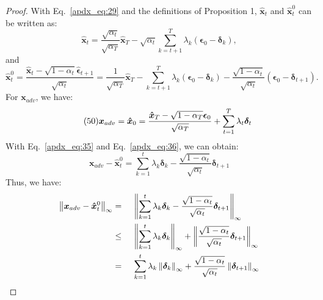 \documentclass{article}
\newtheorem{proof}{Proof}
\begin{document}
\begin{proof}
With Eq.~\eqref{apdx_eq:29} and the definitions of Proposition 1, $\boldsymbol{\hat{x}}_{t}$ and $\boldsymbol{\hat{x}}_{t}^0$ can be written as:
\begin{equation}
    \tag{48}
    \label{apdx_eq:34}
    \boldsymbol{\hat{x}}_{t} = \frac{\sqrt{\alpha_t}}{\sqrt{\alpha_T}}\boldsymbol{\hat{x}}_{T} - \sqrt{\alpha_t}\sum_{k=t+1}^{T}\lambda_k\left(\boldsymbol{\epsilon}_0 - \boldsymbol{\delta}_k\right),
\end{equation}
and 
\begin{equation}
    \tag{49}
    \label{apdx_eq:35}
    \boldsymbol{\hat{x}}_{t}^0 = \frac{\boldsymbol{\hat{x}}_t-\sqrt{1-\alpha_t}\boldsymbol{\hat{\epsilon}}_{t+1}}{\sqrt{\alpha_t}} =
    \frac{1}{\sqrt{\alpha_T}}\boldsymbol{\hat{x}}_{T} - \sum_{k=t+1}^{T}\lambda_k\left(\boldsymbol{\epsilon}_0 - \boldsymbol{\delta}_k\right) - \frac{\sqrt{1-\alpha_t}}{\sqrt{\alpha_t}}\left( \boldsymbol{\epsilon}_0 - \boldsymbol{\delta}_{t+1} \right).
\end{equation}
For $\boldsymbol{{x}}_{adv}$, we have:
\begin{equation}
    \tag{50}
    \label{apdx_eq:36}
    \boldsymbol{{x}}_{adv} = \boldsymbol{\hat{x}}_{0} = \frac{\boldsymbol{\Hat{x}}_{T} - \sqrt{1-\alpha_{T}} \boldsymbol{\epsilon}_0}{\sqrt{\alpha_{T}}} + \sum_{t=1}^{T}\lambda_{t}\boldsymbol{\delta}_t
\end{equation}
With Eq.~\eqref{apdx_eq:35} and Eq.~\eqref{apdx_eq:36}, we can obtain:
\begin{equation}
    \tag{51}
    \label{apdx_eq:37}
    \boldsymbol{{x}}_{adv} - \boldsymbol{\hat{x}}_{t}^0 = \sum_{k=1}^{t}\lambda_{k}\boldsymbol{\delta}_k - \frac{\sqrt{1-\alpha_t}}{\sqrt{\alpha_t}}\boldsymbol{\delta}_{t+1}
\end{equation}
Thus, we have:
\begin{alignat}{2}
\left\|\boldsymbol{{x}}_{adv} - \boldsymbol{\hat{x}}_{t}^0\right\|_\infty \notag 
&= \; && \left\|\sum_{k=1}^{t}\lambda_{k}\boldsymbol{\delta}_k - \frac{\sqrt{1-\alpha_t}}{\sqrt{\alpha_t}}\boldsymbol{\delta}_{t+1} \right\|_\infty \notag \\
&\leq \; && \left\|\sum_{k=1}^{t}\lambda_{k}\boldsymbol{\delta}_k\right\|_\infty + \left\|\frac{\sqrt{1-\alpha_t}}{\sqrt{\alpha_t}}\boldsymbol{\delta}_{t+1} \right\|_\infty \notag \\
&= \; && \sum_{k=1}^{t}\lambda_{k}\left\|\boldsymbol{\delta}_k\right\|_\infty + \frac{\sqrt{1-\alpha_t}}{\sqrt{\alpha_t}}\left\|\boldsymbol{\delta}_{t+1} \right\|_\infty \notag \\

\end{alignat}
\end{proof}
\end{document}
